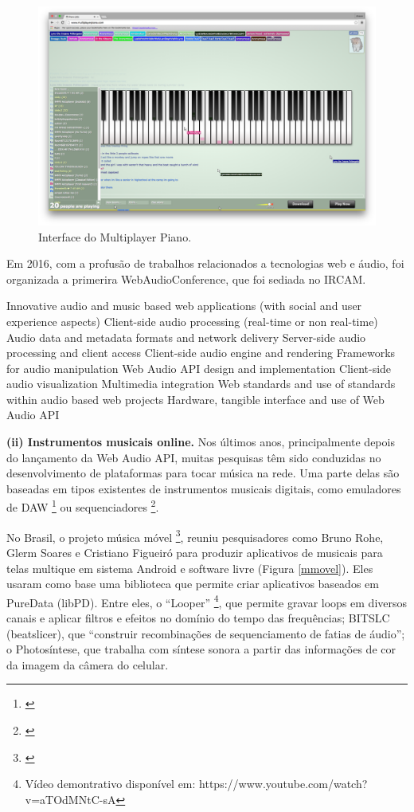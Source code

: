 \begin{figure}
    \caption{\label{multiplayer}Interface do Multiplayer Piano.}
   
        \includegraphics[width=1\linewidth]{pictures/cap2/multiplayerpiano}
   
\end{figure}

Em 2016, com a profusão de trabalhos relacionados a tecnologias web e áudio, foi organizada a primerira WebAudioConference, que foi sediada no IRCAM. 


Innovative audio and music based web applications (with social and user experience aspects)
Client-side audio processing (real-time or non real-time)
Audio data and metadata formats and network delivery
Server-side audio processing and client access
Client-side audio engine and rendering
Frameworks for audio manipulation
Web Audio API design and implementation
Client-side audio visualization
Multimedia integration
Web standards and use of standards within audio based web projects 
Hardware, tangible interface and use of Web Audio API

\textbf{(ii) Instrumentos musicais online.} Nos últimos anos, principalmente depois do lançamento da Web Audio API, muitas pesquisas têm sido conduzidas no desenvolvimento de plataformas para tocar música na rede. Uma parte delas são baseadas em tipos existentes de instrumentos musicais digitais, como emuladores de DAW \footnote{\cite{Jillings2017}} ou sequenciadores \footnote{\cite{Feenstra2016}}.

No Brasil, o projeto música móvel \footnote{\cite{Rohde2014}}, reuniu pesquisadores como Bruno Rohe, Glerm Soares e Cristiano Figueiró para produzir aplicativos de musicais para telas multique em sistema Android e software livre (Figura \ref{mmovel}). Eles usaram como base uma biblioteca que permite criar aplicativos baseados em PureData (libPD). Entre eles, o ``Looper'' \footnote{Vídeo demontrativo disponível em: https://www.youtube.com/watch?v=aTOdMNtC-sA}, que permite gravar loops em diversos canais e aplicar filtros e efeitos no domínio do tempo das frequências; B\/I\/T\/S\/L\/C (beatslicer), que ``construir
recombinações de sequenciamento de fatias de áudio''; o Photosíntese, que trabalha com síntese sonora a partir das informações de cor da imagem da câmera do celular.

